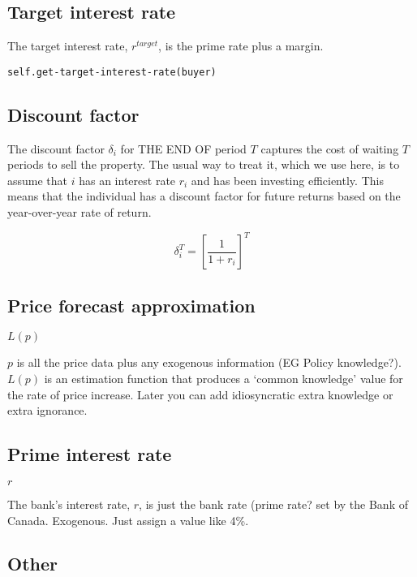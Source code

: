 \subsection{Target interest rate}\label{SS:targetr}

 The target interest rate, $r^{target}$, is the prime rate plus a margin. %

\begin{verbatim}
self.get-target-interest-rate(buyer)
\end{verbatim}



\subsection{Discount factor}\label{SS:discountfactor}

The discount factor $\delta_i$ for THE END OF period $T$ captures the cost of waiting $T$ periods to sell the property. The usual way to treat it, which we use here, is to assume that $i$ has an interest rate $r_i$ and has been investing efficiently. This means that  the individual has a discount factor for future returns based on the year-over-year rate of return. 

\[\delta^T_i=\left[\frac{1}{1+r_i}\right]^T\]



\subsection{Price forecast approximation} \label{SS:PriceForecast}
$L(p)$

$p$ is all the price data plus any exogenous information (EG Policy knowledge?). $L(p)$ is an estimation function that produces a `common knowledge' value for the rate of price increase. Later you can add idiosyncratic extra knowledge or extra ignorance.



\subsection{Prime interest rate}\label{SS:BankRate}
$r$

The bank's interest rate, $r$, is just the bank rate (prime rate? set by the Bank of Canada. Exogenous. Just assign  a value like 4\%.

\subsection{Other}

